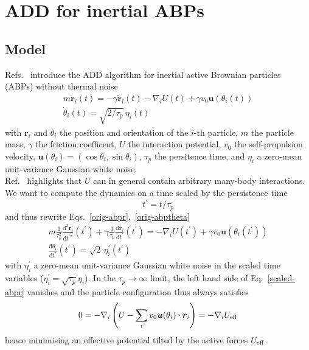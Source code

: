 \documentclass[pre,aps,superscriptaddress,longbibliography,notitlepage]{revtex4-1}
\begin{document}
\section{ADD for inertial ABPs}

\subsection{Model}

Refs.~\cite{mandal2020study,mandal2020multiple} introduce the ADD algorithm for inertial active Brownian particles (ABPs) without thermal noise
\begin{eqnarray}
\label{orig-abpr}
m \ddot{\boldsymbol{r}}_i(t) = - \gamma \dot{\boldsymbol{r}}_i(t) - \nabla_i U(t) + \gamma v_0 \boldsymbol{u}(\theta_i(t))\\
\label{orig-abptheta}
\dot{\theta }_i(t) = \sqrt{2/\tau_p} \, \eta_i(t)
\end{eqnarray}
with $\boldsymbol{r}_i$ and $\theta_i$ the position and orientation of the $i$-th particle, $m$ the particle mass, $\gamma$ the friction coefficent, $U$ the interaction potential, $v_0$ the self-propulsion velocity, $\boldsymbol{u}(\theta_i) = (\cos\theta_i, \sin\theta_i)$, $\tau_p$ the persitence time, and $\eta_i$ a zero-mean unit-variance Gaussian white noise.\\

Ref.~\cite{mandal2020study} highlights that $U$ can in general contain arbitrary many-body interactions.\\

We want to compute the dynamics on a time scaled by the persistence time
\begin{equation}
t^{\prime} = t/\tau_p
\label{time-scale}
\end{equation}
and thus rewrite Eqs.~\ref{orig-abpr},~\ref{orig-abptheta}
\begin{eqnarray}
\label{scaled-abpr}
m\frac{1}{\tau_p^2} \frac{\mathrm{d}^2 \boldsymbol{r}_i}{{\mathrm{d}t^{\prime}}^2}(t^{\prime}) + \gamma \frac{1}{\tau_p} \frac{\mathrm{d}\boldsymbol{r}_i}{\mathrm{d}t^{\prime}}(t^{\prime}) = - \nabla_i U(t^{\prime}) + \gamma v_0 \boldsymbol{u}(\theta_i(t^{\prime}))\\
\label{scaled-abptheta}
\frac{\mathrm{d}\theta_i}{\mathrm{d}t^{\prime}}(t^{\prime}) = \sqrt{2} \, \eta^{\prime}_i(t^{\prime})
\end{eqnarray}
with $\eta^{\prime}_i$ a zero-mean unit-variance Gaussian white noise in the scaled time variables ($\eta_i^{\prime} = \sqrt{\tau_p} \eta_i$). In the $\tau_p \to \infty$ limit, the left hand side of Eq.~\ref{scaled-abpr} vanishes and the particle configuration thus always satisfies
\begin{equation}
0 = -\nabla_i \left(U - \sum_i v_0 \boldsymbol{u}(\theta_i) \cdot \boldsymbol{r}_i\right) = - \nabla_i U_{\rm eff}
\label{Ueff}
\end{equation}
hence minimising an effective potential tilted by the active forces $U_{\rm eff}$.
\end{document}
